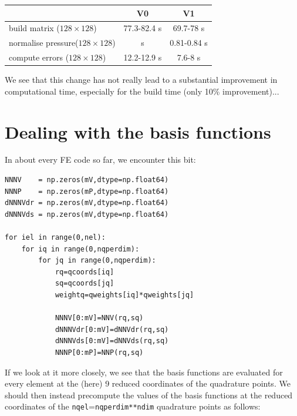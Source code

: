 \begin{center}
\begin{tabular}{lcc}
\hline
& V0 & V1 \\
\hline
\hline
build matrix      ($128\times 128$)& 77.3-82.4 s&  69.7-78 s \\
normalise pressure($128\times 128$)&           s&  0.81-0.84 s\\
compute errors    ($128\times 128$)& 12.2-12.9 s& 7.6-8 s    \\
\hline
\end{tabular}
\end{center}

We see that this change has not really lead to a substantial improvement in 
computational time, especially for the build time (only 10\% improvement)... 



\section*{Dealing with the basis functions}

In about every FE code so far, we encounter this bit:

\begin{lstlisting}
NNNV    = np.zeros(mV,dtype=np.float64) 
NNNP    = np.zeros(mP,dtype=np.float64) 
dNNNVdr = np.zeros(mV,dtype=np.float64) 
dNNNVds = np.zeros(mV,dtype=np.float64) 

for iel in range(0,nel):
    for iq in range(0,nqperdim):
        for jq in range(0,nqperdim):
            rq=qcoords[iq]
            sq=qcoords[jq]
            weightq=qweights[iq]*qweights[jq]

            NNNV[0:mV]=NNV(rq,sq)
            dNNNVdr[0:mV]=dNNVdr(rq,sq)
            dNNNVds[0:mV]=dNNVds(rq,sq)
            NNNP[0:mP]=NNP(rq,sq)
\end{lstlisting}
If we look at it more closely, we see that the basis functions are evaluated for every 
element at the (here) 9 reduced coordinates of the quadrature points. 
We should then instead precompute the values of the basis functions at the 
reduced coordinates of the {\tt nqel}={\tt nqperdim**ndim} quadrature points as follows:

